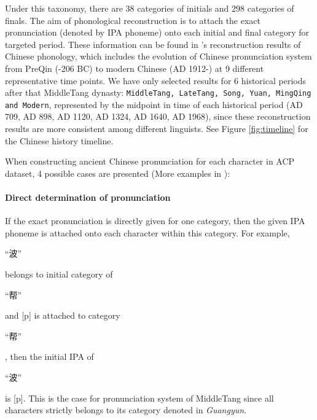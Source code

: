 Under this taxonomy, there are 38 categories of initials and 298 categories of finals. The aim of phonological reconstruction is to attach the exact pronunciation (denoted by IPA phoneme) onto each initial and final category for targeted period. These information can be found in \citet{wang_l_hanyu_2012}'s reconstruction results of Chinese phonology, which includes the evolution of Chinese pronunciation system from PreQin (-206 BC) to modern Chinese (AD 1912-) at 9 different representative time points. We have only selected results for 6 historical periods after that MiddleTang dynasty: \texttt{MiddleTang, LateTang, Song, Yuan, MingQing and Modern}, represented by the midpoint in time of each historical period (AD 709, AD 898, AD 1120, AD 1324, AD 1640, AD 1968), since these reconstruction results are more consistent among different linguists\cite{zuofan_1936,wang_l_hanyu_2012}. See Figure \ref{fig:timeline} for the Chinese history timeline.

When constructing ancient Chinese pronunciation for each character in ACP dataset, 4 possible cases are presented (More examples in  ):

    \paragraph{Direct determination of pronunciation} 
    If the exact pronunciation is directly given for one category, then the given IPA phoneme is attached onto each character within this category. For example, \begin{CJK*}{UTF8}{gbsn}“波”\end{CJK*} belongs to initial category of \begin{CJK*}{UTF8}{gbsn}“帮”\end{CJK*} and [p] is attached to category \begin{CJK*}{UTF8}{gbsn}“帮”\end{CJK*}, then the initial IPA of \begin{CJK*}{UTF8}{gbsn}“波”\end{CJK*} is [p].
    This is the case for pronunciation system of MiddleTang since all characters strictly belongs to its category denoted in \textit{Guangyun}.

